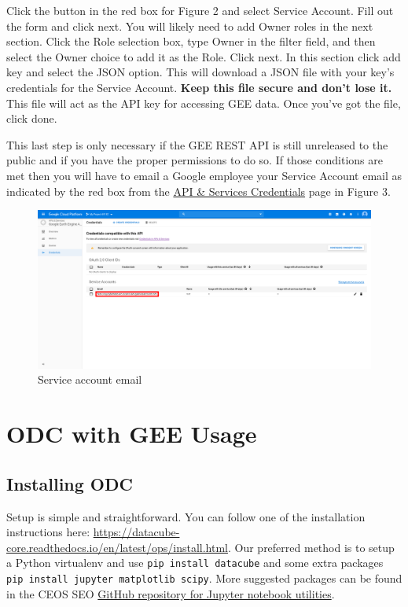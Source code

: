 \documentclass{article}
\begin{document}
Click the button in the red box for Figure 2 and select Service Account. Fill
out the form
and click next. You will likely need to add Owner roles in the next section.
Click the Role selection box, type Owner in the filter field, and then select
the Owner choice to add it as the Role. Click next. In this section click add
key and select the JSON option. This will download a JSON file with your key’s
credentials for the Service Account. \textbf{Keep this file secure and don’t
lose it.} This file will act as the API key for accessing GEE data. Once
you’ve got the file, click done.

This last step is only necessary if the GEE REST API is still unreleased to the
public and if you have the proper permissions to do so. If those conditions are
met then you will have to email a Google employee your Service Account email as
indicated by the red box from the
\href{https://console.cloud.google.com/apis/api/earthengine.googleapis.com/credentials}{API
\& Services Credentials} page in Figure 3.

\begin{figure}
	\caption{Service account email}
	\includegraphics{images/image3.png}
\end{figure}

\part{ODC with GEE Usage}
\chapter{Installing ODC}
Setup is simple and straightforward. You can follow one of the installation
instructions here:
\url{https://datacube-core.readthedocs.io/en/latest/ops/install.html}. Our
preferred method is to setup a Python virtualenv and use
\lstinline{pip install datacube} and some extra packages
\lstinline{pip install jupyter matplotlib scipy}. More suggested packages can
be found in the CEOS SEO
\href{https://github.com/ceos-seo/data_cube_utilities}{GitHub repository for
Jupyter notebook utilities}.
\end{document}
